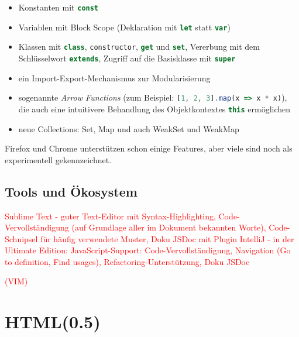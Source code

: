 \documentclass[a4paper, 12pt, hidelinks, listof=totoc, listoftables=totoc, bibliography=totoc]{scrreprt}
\newcommand{\js}[1]{\lstinline[language=JavaScript, style=inline]|#1|}
\newcommand{\TODO}[1]{\textcolor{red}{#1}\newline}
\begin{document}
\begin{itemize}
\item Konstanten mit \js{const}
\item Variablen mit Block Scope (Deklaration mit \js{let} statt \js{var})
\item Klassen mit \js{class}, \js{constructor}, \js{get} und \js{set}, Vererbung mit dem Schlüsselwort \js{extends}, Zugriff auf die Basisklasse mit \js{super}
\item ein Import-Export-Mechanismus zur Modularisierung
\item sogenannte \emph{Arrow Functions} (zum Beispiel: \js{[1, 2, 3].map(x => x * x)}), die auch eine intuitivere Behandlung des Objektkontextes \js{this} ermöglichen
\item neue Collections: Set, Map und auch WeakSet und WeakMap
\end{itemize}

Firefox und Chrome unterstützen schon einige Features, aber viele sind noch als experimentell gekennzeichnet.


\subsection{Tools und Ökosystem}

\TODO{Sublime Text - guter Text-Editor mit Syntax-Highlighting, Code-Vervollständigung (auf Grundlage aller im Dokument bekannten Worte), Code-Schnipsel für häufig verwendete Muster, Doku JSDoc mit Plugin}
\TODO{IntelliJ - in der Ultimate Edition: JavaScript-Support: Code-Vervollständigung, Navigation (Go to definition, Find usages), Refactoring-Unterstützung, Doku JSDoc}

\TODO{(VIM)}


\section{HTML(0.5)}

\end{document}
